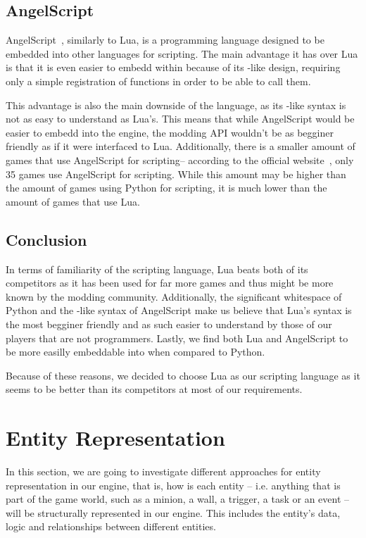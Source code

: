 \subsection{AngelScript}

AngelScript~\cite{AngelScript}, similarly to Lua, is a programming language designed to be embedded into other languages for scripting.
The main advantage it has over Lua is that it is even easier to embedd within \cpp because of its \cpp-like design, requiring only
a simple registration of \cpp functions in order to be able to call them.

This advantage is also the main downside of the language, as its \cpp-like syntax is not as easy to understand as Lua's. This means that while
AngelScript would be easier to embedd into the engine, the modding API wouldn't be as begginer friendly as if it were interfaced
to Lua. Additionally, there is a smaller amount of games that use AngelScript for scripting-- according to the official
website~\cite{AngelScriptGames}, only 35 games use AngelScript for scripting. While this amount may be higher than the amount of games
using Python for scripting, it is much lower than the amount of games that use Lua.

\subsection{Conclusion}

In terms of familiarity of the scripting language, Lua beats both of its competitors as it has been used for far more games and thus
might be more known by the modding community. Additionally, the significant whitespace of Python and the \cpp-like syntax of AngelScript
make us believe that Lua's syntax is the most begginer friendly and as such easier to understand by those of our players that are not
programmers. Lastly, we find both Lua and AngelScript to be more easilly embeddable into \cpp when compared to Python.

Because of these reasons, we decided to choose Lua as our scripting language as it seems to be better than its competitors at most
of our requirements.


\section{Entity Representation}

In this section, we are going to investigate different approaches for entity representation in our engine, that is, how is each
entity -- i.e. anything that is part of the game world, such as a minion, a wall, a trigger, a task or an event -- will be
structurally represented in our engine. This includes the entity's data, logic and relationships between different entities.

